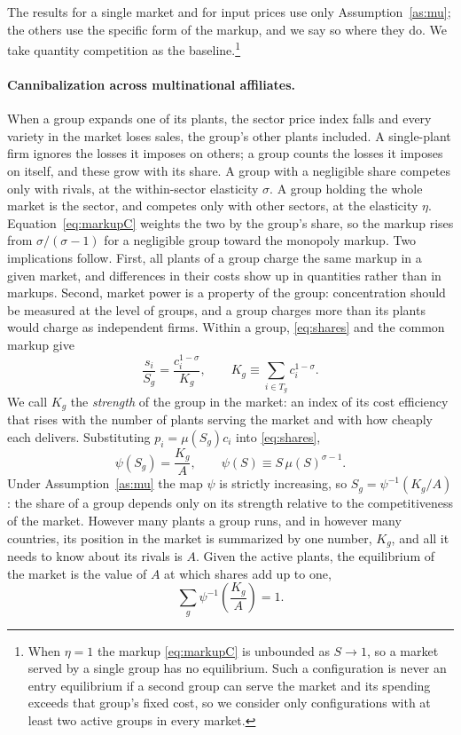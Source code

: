 \documentclass[11pt]{article}
\theoremstyle{definition}
\theoremstyle{remark}
\begin{document}
\noindent The results for a single market and for input prices use only
Assumption~\ref{as:mu}; the others use the specific form of the markup, and we say so
where they do. We take quantity competition as the baseline.\footnote{When $\eta=1$ the
markup \eqref{eq:markupC} is unbounded as $S\to1$, so a market served by a single group
has no equilibrium. Such a configuration is never an entry equilibrium if a second group can serve the
market and its spending exceeds that group's fixed cost, so we consider only
configurations with at least two active groups in every market.}

\paragraph{Cannibalization across multinational affiliates.} When a group expands one
of its plants, the sector price index falls and every variety in the market loses
sales, the group's other plants included. A single-plant firm ignores the losses it
imposes on others; a group counts the losses it imposes on itself, and these grow with
its share. A group with a negligible share competes only with rivals, at the
within-sector elasticity $\sigma$. A group holding the whole market is the sector, and
competes only with other sectors, at the elasticity $\eta$.
Equation~\eqref{eq:markupC} weights the two by the group's share, so the markup rises
from $\sigma/(\sigma-1)$ for a negligible group toward the monopoly markup. Two
implications follow. First, all plants of a group charge the same markup in a given
market, and differences in their costs show up in quantities rather than in markups.
Second, market power is a property of the group: concentration should be measured at
the level of groups, and a group charges more than its plants would charge as
independent firms. Within a group, \eqref{eq:shares} and the common markup give
\begin{equation}
  \frac{s_i}{S_g}=\frac{c_i^{1-\sigma}}{K_g},
  \qquad
  K_g\equiv\sum_{i\in T_g}c_i^{1-\sigma}.
  \label{eq:strength}
\end{equation}
We call $K_g$ the \emph{strength} of the group in the market: an index of its cost
efficiency that rises with the number of plants serving the market and with how cheaply
each delivers. Substituting $p_i=\mu(S_g)c_i$ into \eqref{eq:shares},
\begin{equation}
  \psi(S_g)=\frac{K_g}{A},
  \qquad
  \psi(S)\equiv S\,\mu(S)^{\sigma-1}.
  \label{eq:sharemap}
\end{equation}
Under Assumption~\ref{as:mu} the map $\psi$ is strictly increasing, so
$S_g=\psi^{-1}(K_g/A)$: the share of a group depends only on its strength relative to
the competitiveness of the market. However many plants a group runs, and in however
many countries, its position in the market is summarized by one number, $K_g$, and all
it needs to know about its rivals is $A$. Given the active plants, the equilibrium of the
market is the value of $A$ at which shares add up to one,
\begin{equation}
  \sum_{g}\psi^{-1}\!\left(\frac{K_g}{A}\right)=1 .
  \label{eq:clearing}
\end{equation}
\end{document}
